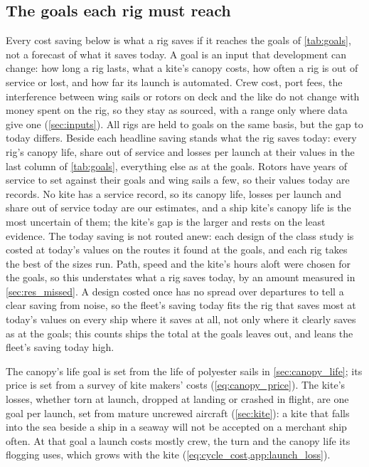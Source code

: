 \subsection{The goals each rig must reach}
\label{sec:res_goals}

Every cost saving below is what a rig saves if it reaches the goals of \cref{tab:goals}, not a forecast of what it saves today. A goal is an input that development can change: how long a rig lasts, what a kite's canopy costs, how often a rig is out of service or lost, and how far its launch is automated. Crew cost, port fees, the interference between wing sails or rotors on deck and the like do not change with money spent on the rig, so they stay as sourced, with a range only where data give one (\cref{sec:inputs}). All rigs are held to goals on the same basis, but the gap to today differs. Beside each headline saving stands what the rig saves today: every rig's canopy life, share out of service and losses per launch at their values in the last column of \cref{tab:goals}, everything else as at the goals. Rotors have years of service to set against their goals and wing sails a few, so their values today are records. No kite has a service record, so its canopy life, losses per launch and share out of service today are our estimates, and a ship kite's canopy life is the most uncertain of them; the kite's gap is the larger and rests on the least evidence. The today saving is not routed anew: each design of the class study is costed at today's values on the routes it found at the goals, and each rig takes the best of the sizes run. Path, speed and the kite's hours aloft were chosen for the goals, so this understates what a rig saves today, by an amount measured in \cref{sec:res_missed}. A design costed once has no spread over departures to tell a clear saving from noise, so the fleet's saving today fits the rig that saves most at today's values on every ship where it saves at all, not only where it clearly saves as at the goals; this counts ships the total at the goals leaves out, and leans the fleet's saving today high.

\begin{table}[tbp]
\centering
\footnotesize
\caption{The goals behind the results, each with its range in \cref{tab:inputs}, and what is known today.}
\label{tab:goals}
\end{table}

The canopy's life goal is set from the life of polyester sails in \cref{sec:canopy_life}; its price is set from a survey of kite makers' costs (\cref{eq:canopy_price}). The kite's losses, whether torn at launch, dropped at landing or crashed in flight, are one goal per launch, set from mature uncrewed aircraft (\cref{sec:kite}): a kite that falls into the sea beside a ship in a seaway will not be accepted on a merchant ship often. At that goal a launch costs mostly crew, the turn and the canopy life its flogging uses, which grows with the kite (\cref{eq:cycle_cost,app:launch_loss}).
